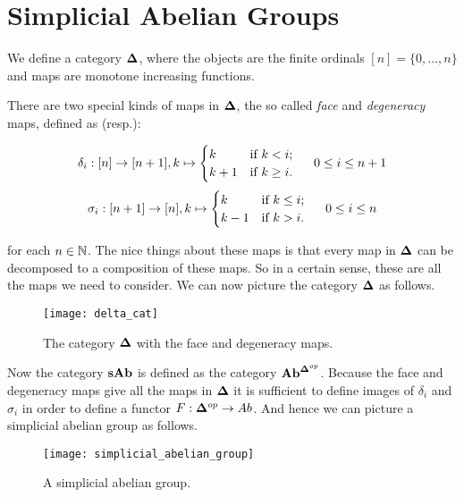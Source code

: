 \section{Simplicial Abelian Groups}
\label{sec:Simplicial Abelian Groups}

\begin{definition}
	We define a category $\mathbf{\Delta}$, where the objects are the finite ordinals $[n] = \{0, \dots, n\}$ and maps are monotone increasing functions.
\end{definition}

There are two special kinds of maps in $\mathbf{\Delta}$, the so called \emph{face} and \emph{degeneracy} maps, defined as (resp.):

$$\delta_i: [n] \to [n+1], k \mapsto \begin{cases} k & \text{if } k < i;\\ k+1 & \text{if } k \geq i. \end{cases} \hspace{0.5cm} 0 \leq i \leq n+1$$
$$\sigma_i: [n+1] \to [n], k \mapsto \begin{cases} k & \text{if } k \leq i;\\ k-1 & \text{if } k > i. \end{cases} \hspace{0.5cm} 0 \leq i \leq n$$

for each $n \in \mathbb{N}$. The nice things about these maps is that every map in $\mathbf{\Delta}$ can be decomposed to a composition of these maps. So in a certain sense, these are all the maps we need to consider. We can now picture the category $\mathbf{\Delta}$ as follows.

\begin{figure}[h!]
	\label{fig:delta_cat}
	\texttt{[image: delta\_cat]}
	\caption{The category $\mathbf{\Delta}$ with the face and degeneracy maps.}
\end{figure}


Now the category $\mathbf{sAb}$ is defined as the category $\mathbf{Ab}^{\mathbf{\Delta}^{op}}$. Because the face and degeneracy maps give all the maps in $\mathbf{\Delta}$ it is sufficient to define images of $\delta_i$ and $\sigma_i$ in order to define a functor $F: \mathbf{\Delta}^{op} \to Ab$. And hence we can picture a simplicial abelian group as follows.

\begin{figure}
	\label{fig:simplicial_abelian_group}
	\texttt{[image: simplicial\_abelian\_group]}
	\caption{A simplicial abelian group.}
\end{figure}

